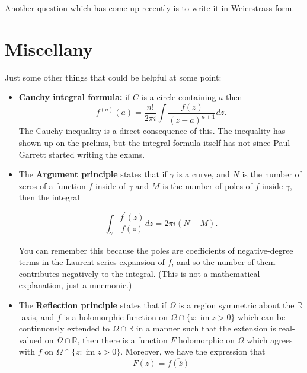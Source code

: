 \documentclass[10pt]{article}
\DeclareMathOperator{\im}{im}
\begin{document}
Another question which has come up recently is to write it in Weierstrass form.


\section{Miscellany}

Just some other things that could be helpful at some point:
\begin{itemize}
	\item \textbf{Cauchy integral formula:} if $C$ is a circle containing $a$ then 
	\[ f^{(n)}(a) = \frac{n!}{2\pi i} \int \frac{f(z)}{(z-a)^{n+1}} dz.\]
	The Cauchy inequality is a direct consequence of this. The inequality has shown up on the prelims, but the integral formula itself has not
	since Paul Garrett started writing the exams.
	 
	\item The \textbf{Argument principle} states that if $\gamma$ is a curve, and $N$ is the number of zeros of a function $f$ inside of $\gamma$
	and $M$ is the number of poles of $f$ inside $\gamma$, then the integral
	
	\[ \int_{\gamma} \frac{f^\prime(z)}{f(z)} dz = 2\pi i (N-M).\]
	
	You can remember this because the poles are coefficients of negative-degree terms in the Laurent series expansion of $f$,
	and so the number of them contributes negatively to the integral. (This is not a mathematical explanation, just a mnemonic.)
	
	\item The \textbf{Reflection principle} states that if $\Omega$ is a region symmetric about the $\mathbb{R}$-axis, and $f$ is
	a holomorphic function on $ \Omega \cap \{ z : \im z > 0 \}$ which can be continuously extended to $\Omega  \cap \mathbb{R}$ 
	in a manner such that the extension is real-valued on $\Omega \cap \mathbb{R}$, then there is a function $F$ holomorphic on
	$\Omega$ which agrees with $f$ on $\Omega \cap \{ z : \im z > 0\}$. Moreover, we have the expression that
	\[ F(z) = \overline{f(\overline{z})}\]
	
\end{itemize}
\end{document}
